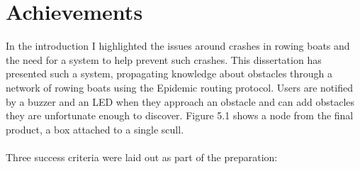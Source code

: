 \documentclass[12pt,a4paper]{report}
\begin{document}
\section{Achievements}
In the introduction I highlighted the issues around crashes in rowing boats and the need for a system to help prevent such crashes. This dissertation has presented such a system, propagating knowledge about obstacles through a network of rowing boats using the Epidemic routing protocol. Users are notified by a buzzer and an LED when they approach an obstacle and can add obstacles they are unfortunate enough to discover. Figure 5.1 shows a node from the final product, a box attached to a single scull. \\ \\
Three success criteria were laid out as part of the preparation: \\ 
\end{document}
